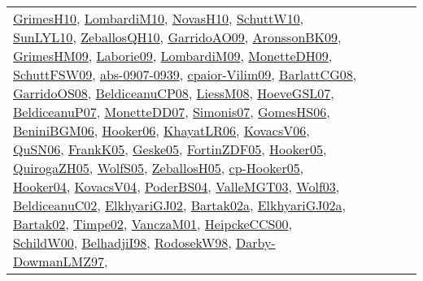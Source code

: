 {\begin{longtable}{lp{3cm}>{\raggedright}p{6cm}>{\raggedright}p{6cm}p{8cm}}
\href{papers/GrimesH10.pdf}{GrimesH10}\cite{GrimesH10}, \href{papers/LombardiM10.pdf}{LombardiM10}\cite{LombardiM10}, \href{articles/NovasH10.pdf}{NovasH10}\cite{NovasH10}, \href{papers/SchuttW10.pdf}{SchuttW10}\cite{SchuttW10}, \href{papers/SunLYL10.pdf}{SunLYL10}\cite{SunLYL10}, \href{articles/ZeballosQH10.pdf}{ZeballosQH10}\cite{ZeballosQH10}, \href{articles/GarridoAO09.pdf}{GarridoAO09}\cite{GarridoAO09}, \href{papers/AronssonBK09.pdf}{AronssonBK09}\cite{AronssonBK09}, \href{papers/GrimesHM09.pdf}{GrimesHM09}\cite{GrimesHM09}, \href{papers/Laborie09.pdf}{Laborie09}\cite{Laborie09}, \href{papers/LombardiM09.pdf}{LombardiM09}\cite{LombardiM09}, \href{papers/MonetteDH09.pdf}{MonetteDH09}\cite{MonetteDH09}, \href{papers/SchuttFSW09.pdf}{SchuttFSW09}\cite{SchuttFSW09}, \href{articles/abs-0907-0939.pdf}{abs-0907-0939}\cite{abs-0907-0939}, \href{papers/cpaior-Vilim09.pdf}{cpaior-Vilim09}\cite{cpaior-Vilim09}, \href{papers/BarlattCG08.pdf}{BarlattCG08}\cite{BarlattCG08}, \href{articles/GarridoOS08.pdf}{GarridoOS08}\cite{GarridoOS08}, \href{papers/BeldiceanuCP08.pdf}{BeldiceanuCP08}\cite{BeldiceanuCP08}, \href{articles/LiessM08.pdf}{LiessM08}\cite{LiessM08}, \href{papers/HoeveGSL07.pdf}{HoeveGSL07}\cite{HoeveGSL07}, \href{papers/BeldiceanuP07.pdf}{BeldiceanuP07}\cite{BeldiceanuP07}, \href{papers/MonetteDD07.pdf}{MonetteDD07}\cite{MonetteDD07}, \href{articles/Simonis07.pdf}{Simonis07}\cite{Simonis07}, \href{papers/GomesHS06.pdf}{GomesHS06}\cite{GomesHS06}, \href{papers/BeniniBGM06.pdf}{BeniniBGM06}\cite{BeniniBGM06}, \href{articles/Hooker06.pdf}{Hooker06}\cite{Hooker06}, \href{articles/KhayatLR06.pdf}{KhayatLR06}\cite{KhayatLR06}, \href{papers/KovacsV06.pdf}{KovacsV06}\cite{KovacsV06}, \href{papers/QuSN06.pdf}{QuSN06}\cite{QuSN06}, \href{papers/FrankK05.pdf}{FrankK05}\cite{FrankK05}, \href{papers/Geske05.pdf}{Geske05}\cite{Geske05}, \href{papers/FortinZDF05.pdf}{FortinZDF05}\cite{FortinZDF05}, \href{articles/Hooker05.pdf}{Hooker05}\cite{Hooker05}, \href{papers/QuirogaZH05.pdf}{QuirogaZH05}\cite{QuirogaZH05}, \href{papers/WolfS05.pdf}{WolfS05}\cite{WolfS05}, \href{articles/ZeballosH05.pdf}{ZeballosH05}\cite{ZeballosH05}, \href{papers/cp-Hooker05.pdf}{cp-Hooker05}\cite{cp-Hooker05}, \href{papers/Hooker04.pdf}{Hooker04}\cite{Hooker04}, \href{papers/KovacsV04.pdf}{KovacsV04}\cite{KovacsV04}, \href{articles/PoderBS04.pdf}{PoderBS04}\cite{PoderBS04}, \href{papers/ValleMGT03.pdf}{ValleMGT03}\cite{ValleMGT03}, \href{papers/Wolf03.pdf}{Wolf03}\cite{Wolf03}, \href{papers/BeldiceanuC02.pdf}{BeldiceanuC02}\cite{BeldiceanuC02}, \href{papers/ElkhyariGJ02.pdf}{ElkhyariGJ02}\cite{ElkhyariGJ02}, \href{papers/Bartak02a.pdf}{Bartak02a}\cite{Bartak02a}, \href{papers/ElkhyariGJ02a.pdf}{ElkhyariGJ02a}\cite{ElkhyariGJ02a}, \href{papers/Bartak02.pdf}{Bartak02}\cite{Bartak02}, \href{articles/Timpe02.pdf}{Timpe02}\cite{Timpe02}, \href{papers/VanczaM01.pdf}{VanczaM01}\cite{VanczaM01}, \href{articles/HeipckeCCS00.pdf}{HeipckeCCS00}\cite{HeipckeCCS00}, \href{articles/SchildW00.pdf}{SchildW00}\cite{SchildW00}, \href{articles/BelhadjiI98.pdf}{BelhadjiI98}\cite{BelhadjiI98}, \href{papers/RodosekW98.pdf}{RodosekW98}\cite{RodosekW98}, \href{articles/Darby-DowmanLMZ97.pdf}{Darby-DowmanLMZ97}\cite{Darby-DowmanLMZ97}, 
\end{longtable}}
